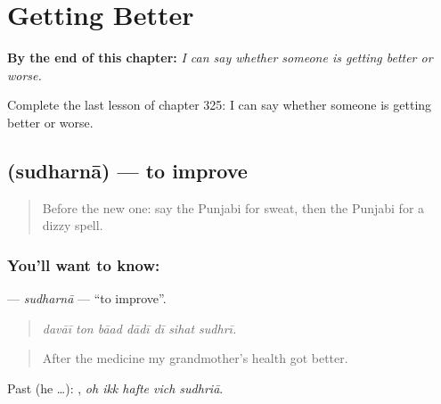 
\chapter{Getting Better}
\label{ch:pa-a2-getting-better}

\begin{chapteropening}
\textbf{By the end of this chapter:} \emph{I can say whether someone is getting better or worse.}

Complete the last lesson of chapter 325: I can say whether someone is getting better or worse.
\end{chapteropening}

\section[\texorpdfstring{\pa{ਸੁਧਰਨਾ} (sudharnā)}{ਸੁਧਰਨਾ (sudharnā)}]{ (sudharnā) — to improve}

\label{lesson:PA-C325-sudharna}



\begin{quote}
Before the new one: say the Punjabi for sweat, then the Punjabi for a dizzy spell.
\end{quote}

\subsection*{You'll want to know: }
\textbf{} — \emph{sudharnā} — \textquotedblleft{}to improve\textquotedblright{}.

\begin{quote}
      
\end{quote}

\begin{quote}
\emph{davāī ton bāad dādī dī sihat sudhrī.}
\end{quote}

\begin{quote}
After the medicine my grandmother's health got better.
\end{quote}

Past (he …):     , \emph{oh ikk hafte vich sudhriā}.

